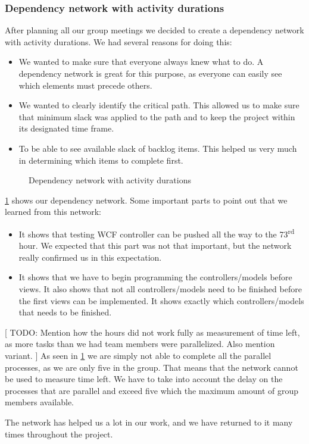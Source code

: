 \subsubsection{Dependency network with activity durations}
After planning all our group meetings we decided to create a dependency network with activity durations. We had several reasons for doing this:

\begin{itemize}
	\item We wanted to make sure that everyone always knew what to do. A dependency network is great for this purpose, as everyone can easily see which elements must precede others.
	\item We wanted to clearly identify the critical path. This allowed us to make sure that minimum slack was applied to the path and to keep the project within its designated time frame.
	\item To be able to see available slack of backlog items. This helped us very much in determining which items to complete first.
\end{itemize}

\begin{figure}[H]
  \caption{Dependency network with activity durations}
  \label{dependency network}
\end{figure}

\cref{dependency network} shows our dependency network.
Some important parts to point out that we learned from this network:
\begin{itemize}
	\item It shows that testing WCF controller can be pushed all the way to the 73\textsuperscript{rd} hour. We expected that this part was not that important, but the network really confirmed us in this expectation.
	\item It shows that we have to begin programming the controllers/models before views. It also shows that not all controllers/models need to be finished before the first views can be implemented. It shows exactly which controllers/models that needs to be finished.
\end{itemize}

[ TODO: Mention how the hours did not work fully as measurement of time left, as more tasks than we had team members were parallelized. Also mention variant. ]
As seen in \cref{dependency network} we are simply not able to complete all the parallel processes, as we are only five in the group. That means that the network cannot be used to measure time left. We have to take into account the delay on the processes that are parallel and exceed five which the maximum amount of group members available.

The network has helped us a lot in our work, and we have returned to it many times throughout the project.